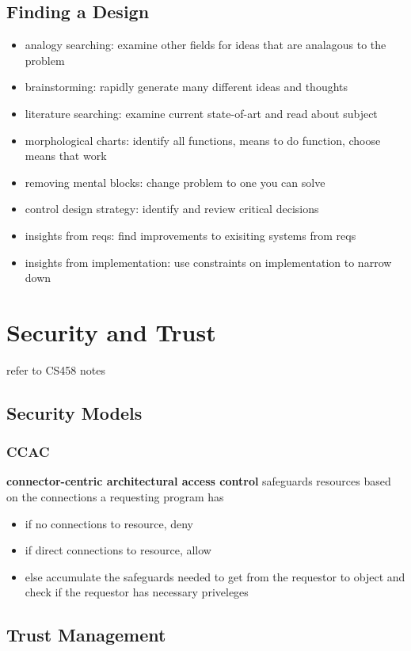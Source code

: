 \documentclass[]{article}
\theoremstyle{definition}
\begin{document}
	\subsection{Finding a Design}
	\begin{itemize}
		\item analogy searching: examine other fields for ideas that are analagous to the problem
		\item brainstorming: rapidly generate many different ideas and thoughts
		\item literature searching: examine current state-of-art and read about subject
		\item morphological charts: identify all functions, means to do function, choose means that work
		\item removing mental blocks: change problem to one you can solve
		\item control design strategy: identify and review critical decisions
		\item insights from reqs: find improvements to exisiting systems from reqs
		\item insights from implementation: use constraints on implementation to narrow down
	\end{itemize}

	\section{Security and Trust}
	refer to CS458 notes

	\subsection{Security Models}
	\subsubsection{CCAC}
	\textbf{connector-centric architectural access control} safeguards resources based on the connections a requesting program has
	\begin{itemize}
		\item if no connections to resource, deny
		\item if direct connections to resource, allow
		\item else accumulate the safeguards needed to get from the requestor to object and check if the requestor has necessary priveleges
	\end{itemize}

	\subsection{Trust Management}
\end{document}
